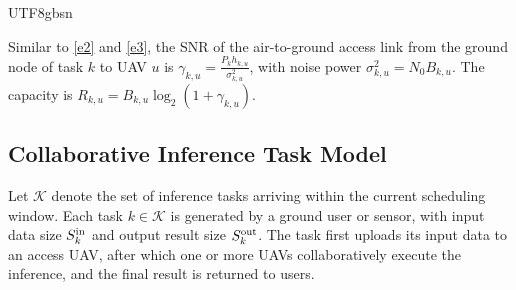 \documentclass[journal]{IEEEtran}
\begin{document}
\begin{CJK*}{UTF8}{gbsn}

Similar to \eqref{e2} and \eqref{e3}, the SNR of the air-to-ground access link from the ground node of task \(k\) to UAV \(u\) is
$\gamma_{k,u} = \frac{P_k h_{k,u}}{\sigma_{k,u}^2}$,
with noise power $\sigma_{k,u}^2 = N_0 B_{k,u}$. The capacity is
$R_{k,u} = B_{k,u} \log_2 (1 + \gamma_{k,u})$.




\subsection{Collaborative Inference Task Model}

Let \(\mathcal{K}\) denote the set of inference tasks arriving within the current scheduling window. Each task \(k \in \mathcal{K}\) is generated by a ground user or sensor, with input data size \(S_k^{\rm in}\) and output result size \(S_k^{\rm out}\). The task first uploads its input data to an access UAV, after which one or more UAVs collaboratively execute the inference, and the final result is returned to users.


\end{CJK*}
\end{document}
